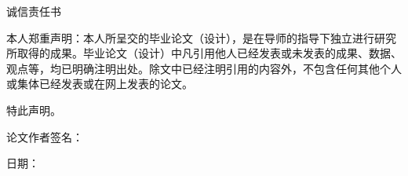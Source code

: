 \begin{center}
\heiti{}诚信责任书
\end{center}
\vspace{1cm}

\songti{}本人郑重声明：本人所呈交的毕业论文（设计），是在导师的指导下独立进行研究所取得的成果。毕业论文（设计）中凡引用他人已经发表或未发表的成果、数据、观点等，均已明确注明出处。除文中已经注明引用的内容外，不包含任何其他个人或集体已经发表或在网上发表的论文。

特此声明。
\vspace{4cm}


\begin{flushleft}
论文作者签名：\QHUunderline[60pt]{}
\end{flushleft}

\begin{flushright}
日期：\QHUunderline[120pt]{}
\end{flushright}

